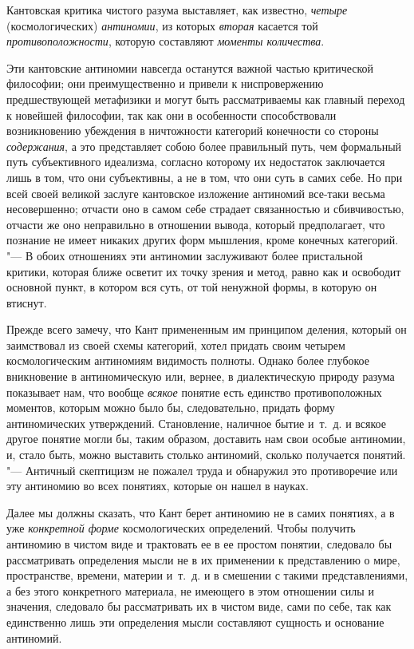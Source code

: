 Кантовская критика чистого разума выставляет, как известно, {\em четыре}
(космологических) {\em антиномии}, из которых {\em вторая} касается той
{\em противоположности}, которую составляют {\em моменты количества}.

Эти кантовские антиномии навсегда останутся важной частью критической
философии; они преимущественно и привели к ниспровержению предшествующей
метафизики и могут быть рассматриваемы как главный переход к новейшей
философии, так как они в особенности способствовали возникновению убеждения
в ничтожности категорий конечности со стороны
{\em содержания}, а это представляет собою более
правильный путь, чем формальный путь субъективного идеализма, согласно
которому их недостаток заключается лишь в том, что они субъективны, а не в
том, что они суть в самих себе. Но при всей своей великой заслуге
кантовское изложение антиномий все-таки весьма несовершенно; отчасти оно в
самом себе страдает связанностью и сбивчивостью, отчасти же оно неправильно
в отношении вывода, который предполагает, что познание не имеет никаких
других форм мышления, кроме конечных категорий. "--- В обоих отношениях эти
антиномии заслуживают более пристальной критики, которая ближе осветит их
точку зрения и метод, равно как и освободит основной пункт, в котором вся
суть, от той ненужной формы, в которую он втиснут.

Прежде всего замечу, что Кант примененным им принципом деления, который он
заимствовал из своей схемы категорий, хотел придать своим четырем
космологическим антиномиям видимость полноты. Однако более глубокое
вникновение в антиномическую или, вернее, в диалектическую природу разума
показывает нам, что вообще {\em всякое} понятие есть
единство противоположных моментов, которым можно было бы, следовательно,
придать форму антиномических утверждений. Становление, наличное бытие
и~т.~д. и всякое другое понятие могли бы, таким образом, доставить нам свои
особые антиномии, и, стало быть, можно выставить столько антиномий, сколько
получается понятий. "--- Античный скептицизм не пожалел труда и обнаружил это
противоречие или эту антиномию во всех понятиях, которые он нашел в науках.

Далее мы должны сказать, что Кант берет антиномию не в самих понятиях, а в
уже {\em конкретной форме} космологических определений.
Чтобы получить антиномию в чистом виде и трактовать ее в ее простом
понятии, следовало бы рассматривать определения мысли не в их применении к
представлению о мире, пространстве, времени, материи и~т.~д. и в смешении с
такими представлениями, а без этого конкретного материала, не имеющего в
этом отношении силы и значения, следовало бы рассматривать их в чистом
виде, сами по себе, так как единственно лишь эти определения мысли
составляют сущность и основание антиномий.

